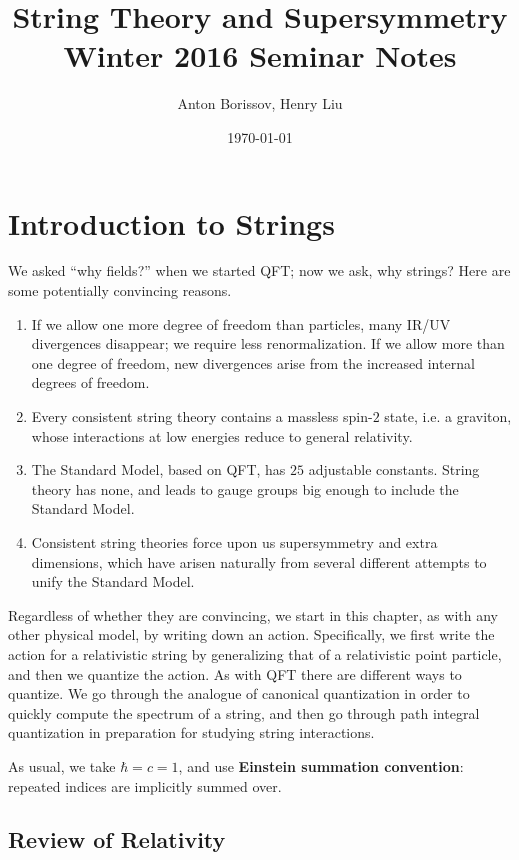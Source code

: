 \documentclass{report}
\title{String Theory and Supersymmetry\\Winter 2016 Seminar Notes}
\author{Anton Borissov, Henry Liu}
\date{\today}
\theoremstyle{plain}
\theoremstyle{definition}
\theoremstyle{remark}
\begin{document}
\maketitle

\tableofcontents

\chapter{Introduction to Strings}

We asked ``why fields?'' when we started QFT; now we ask, why strings?
Here are some potentially convincing reasons.
\begin{enumerate}
\item If we allow one more degree of freedom than particles, many
  IR/UV divergences disappear; we require less renormalization. If we
  allow more than one degree of freedom, new divergences arise from
  the increased internal degrees of freedom.
\item Every consistent string theory contains a massless spin-$2$
  state, i.e. a graviton, whose interactions at low energies reduce to
  general relativity.
\item The Standard Model, based on QFT, has $25$ adjustable constants.
  String theory has none, and leads to gauge groups big enough to
  include the Standard Model.
\item Consistent string theories force upon us supersymmetry and
  extra dimensions, which have arisen naturally from several different
  attempts to unify the Standard Model.
\end{enumerate}

Regardless of whether they are convincing, we start in this chapter,
as with any other physical model, by writing down an action.
Specifically, we first write the action for a relativistic string by
generalizing that of a relativistic point particle, and then we
quantize the action. As with QFT there are different ways to quantize.
We go through the analogue of canonical quantization in order to
quickly compute the spectrum of a string, and then go through path
integral quantization in preparation for studying string interactions.

As usual, we take $\hbar = c = 1$, and use {\bf Einstein summation
  convention}: repeated indices are implicitly summed over.

\section{Review of Relativity}
\end{document}
